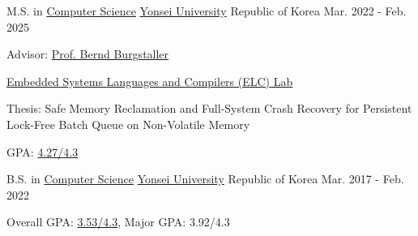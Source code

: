 

\begin{cventries}

  \cventry
    {M.S. in \href{https://cs.yonsei.ac.kr/index.php}{Computer Science}} %
    {\href{https://www.yonsei.ac.kr/sc/index.jsp}{Yonsei University}} %
    {Republic of Korea} %
    {Mar. 2022 - Feb. 2025} %
    {
      \begin{cvitems} %
        \item {Advisor: \href{https://cs.yonsei.ac.kr/bbs/board.php?bo_table=sub2_1_a&wr_id=18}{Prof. Bernd Burgstaller}}
        \item {\href{https://elc.yonsei.ac.kr}{Embedded Systems Languages and Compilers (ELC) Lab}}
        \item {Thesis: Safe Memory Reclamation and Full-System Crash Recovery for Persistent Lock-Free Batch Queue on Non-Volatile Memory}
        \item {GPA: \href{https://drive.google.com/file/d/1p5EAixYWCerQ1rd1fb-1V0mppF3Dal0N/view?usp=sharing}{4.27/4.3}}
      \end{cvitems}
    }

  \cventry
    {B.S. in \href{https://cs.yonsei.ac.kr/index.php}{Computer Science}} %
    {\href{https://www.yonsei.ac.kr/sc/index.jsp}{Yonsei University}} %
    {Republic of Korea} %
    {Mar. 2017 - Feb. 2022} %
    {
      \begin{cvitems} %
        \item {Overall GPA: \href{https://drive.google.com/file/d/1g-O5m43w4wgwSG9iAbFg4uPoqe1EhkWh/view?usp=sharing}{3.53/4.3}, Major GPA: 3.92/4.3}
      \end{cvitems}
    }
\end{cventries}
